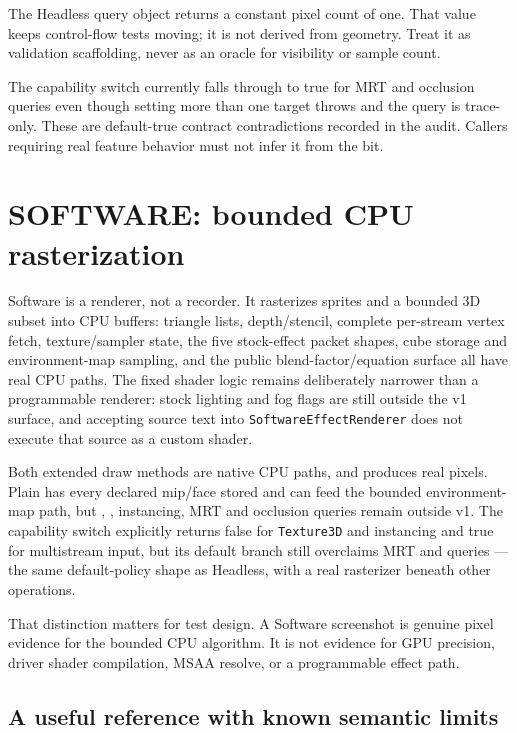 The Headless query object returns a constant pixel count of one.  That value keeps control-flow
tests moving; it is not derived from geometry.  Treat it as validation scaffolding, never as an
oracle for visibility or sample count.

The capability switch currently falls through to true for MRT and occlusion queries even
though setting more than one target throws and the query is trace-only.  These are default-true
contract contradictions recorded in the audit.  Callers requiring real feature behavior must
not infer it from the bit.

\section{SOFTWARE: bounded CPU rasterization}

Software is a renderer, not a recorder. It rasterizes sprites and a bounded 3D subset into CPU
buffers: triangle lists, depth/stencil, complete per-stream vertex fetch, texture/sampler state,
the five stock-effect packet shapes, cube storage and environment-map sampling, and the public
blend-factor/equation surface all have real CPU paths. The fixed shader logic remains deliberately
narrower than a programmable renderer: stock lighting and fog flags are still outside the v1
surface, and accepting source text into \texttt{SoftwareEffectRenderer} does not execute that
source as a custom shader.

Both extended draw methods are native CPU paths, and  produces real
pixels. Plain  has every declared mip/face stored and can feed the bounded
environment-map path, but , , instancing, MRT and
occlusion queries remain outside v1. The capability switch explicitly returns false for
\texttt{Texture3D} and instancing and true for multistream input, but its default branch still
overclaims MRT and queries --- the same default-policy shape as Headless, with a real rasterizer
beneath other operations.

That distinction matters for test design.  A Software screenshot is genuine pixel evidence for
the bounded CPU algorithm.  It is not evidence for GPU precision, driver shader compilation,
MSAA resolve, or a programmable effect path.

\subsection{A useful reference with known semantic limits}

